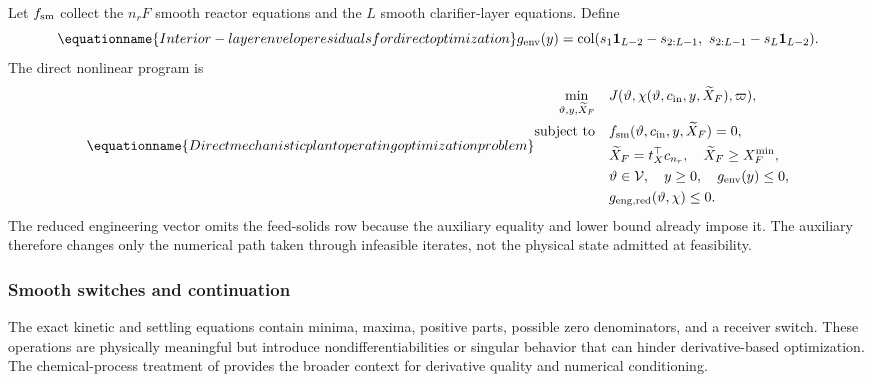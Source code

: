 Let $f_{\rm sm}$ collect the $n_rF$ smooth reactor equations and the $L$ smooth clarifier-layer equations. Define
\begin{equation}
\equationname{Interior-layer envelope residuals for direct optimization}
g_{\rm env}(y)=\operatorname{col}
(s_1\mathbf1_{L-2}-s_{2:L-1},\ s_{2:L-1}-s_L\mathbf1_{L-2}).
\end{equation}
The direct nonlinear program is
\begin{equation}
\equationname{Direct mechanistic plant operating optimization problem}
\begin{aligned}
\min_{\vartheta,y,\widetilde X_F}\quad&J(\vartheta,\chi(\vartheta,c_{\rm in},y,\widetilde X_F),\varpi),\\
\text{subject to}\quad&f_{\rm sm}(\vartheta,c_{\rm in},y,\widetilde X_F)=0,\\
&\widetilde X_F=t_X^\top c_{n_r},\quad\widetilde X_F\ge X_F^{\min},\\
&\vartheta\in\mathcal V,\quad y\ge0,\quad g_{\rm env}(y)\le0,\\
&g_{{\rm eng},\rm red}(\vartheta,\chi)\le0.
\end{aligned}
\label{eq:plant_direct_optimization}
\end{equation}
The reduced engineering vector omits the feed-solids row because the auxiliary equality and lower bound already impose it. The auxiliary therefore changes only the numerical path taken through infeasible iterates, not the physical state admitted at feasibility.

\subsubsection{Smooth switches and continuation}

The exact kinetic and settling equations contain minima, maxima, positive parts, possible zero denominators, and a receiver switch. These operations are physically meaningful but introduce nondifferentiabilities or singular behavior that can hinder derivative-based optimization. The chemical-process treatment of \citet{BuzziFerraris2013} provides the broader context for derivative quality and numerical conditioning.

